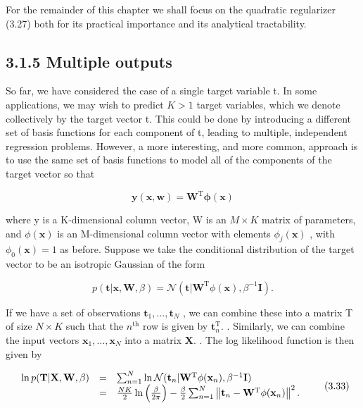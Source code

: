 \documentclass[
  10
]{article}
\begin{document}
For the remainder of this chapter we shall focus on the quadratic
regularizer (3.27) both for its practical importance and its analytical
tractability.

\subsection{3.1.5 Multiple outputs}\label{multiple-outputs}

So far, we have considered the case of a single target variable t. In
some applications, we may wish to predict \(K > 1\) target variables,
which we denote collectively by the target vector t. This could be done
by introducing a different set of basis functions for each component of
t, leading to multiple, independent regression problems. However, a more
interesting, and more common, approach is to use the same set of basis
functions to model all of the components of the target vector so that

\[
\mathbf {y} (\mathbf {x}, \mathbf {w}) = \mathbf {W} ^ {\mathrm{T}} \boldsymbol {\phi} (\mathbf {x})\tag{3.31}
\]

where y is a K-dimensional column vector, W is an \(M \times K\) matrix
of parameters, and \(\phi ( \mathbf { x } )\) is an M-dimensional column
vector with elements \(\phi _ { j } ( \mathbf { x } )\) , with
\(\phi _ { 0 } ( \mathbf { x } ) = 1\) as before. Suppose we take the
conditional distribution of the target vector to be an isotropic
Gaussian of the form

\[
p (\mathbf {t} | \mathbf {x}, \mathbf {W}, \beta) = \mathcal {N} (\mathbf {t} | \mathbf {W} ^ {\mathrm{T}} \phi (\mathbf {x}), \beta^ {- 1} \mathbf {I}).\tag{3.32}
\]

If we have a set of observations
\(\mathbf { t } _ { 1 } , \ldots , \mathbf { t } _ { N }\) , we can
combine these into a matrix T of size \(N \times K\) such that the
\(n ^ { \mathrm { t h } }\) row is given by
\(\mathbf { t } _ { n } ^ { \mathrm { T } } .\) . Similarly, we can
combine the input vectors
\(\mathbf { x } _ { 1 } , \ldots , \mathbf { x } _ { N }\) into a matrix
\(\mathbf { X } .\) . The log likelihood function is then given by

\[
\begin{array}{l l l} \ln p (\mathbf {T} | \mathbf {X}, \mathbf {W}, \beta) & = & \sum_ {n = 1} ^ {N} \ln \mathcal {N} (\mathbf {t} _ {n} | \mathbf {W} ^ {\mathrm{T}} \phi (\mathbf {x} _ {n}), \beta^ {- 1} \mathbf {I}) \\ & = & \frac {N K}{2} \ln \left(\frac {\beta}{2 \pi}\right) - \frac {\beta}{2} \sum_ {n = 1} ^ {N} \left\| \mathbf {t} _ {n} - \mathbf {W} ^ {\mathrm{T}} \phi (\mathbf {x} _ {n}) \right\| ^ {2}. \end{array}\tag{3.33}
\]
\end{document}
